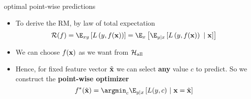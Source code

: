 \documentclass[11pt,compress,t,notes=noshow, xcolor=table]{beamer}
\begin{document}



% 
% 



\begin{frame}[t]{optimal point-wise predictions}  

\begin{itemize}

\item To derive the RM, by law of total expectation 
$$    \riskf = \E_{xy} \left[\Lxy\right] 
= \E_x \left[\E_{y|x}\left[\Lxy~|~\xv\right]\right]$$

\item We can choose $f(\mathbf{x})$ as we want from $\mathcal{H}_{\text{all}}$ %
\item Hence, for fixed feature vector $\tilde{\mathbf{x}}$ we can select \textbf{any} value $c$ to predict. So we construct the \textbf{point-wise optimizer} 
$$\fbayes(\xtil) = \argmin_c \E_{y|x}\left[L(y, c)~|~ \xv = \xtil \right] $$

\end{itemize}


\end{frame}
\end{document}
